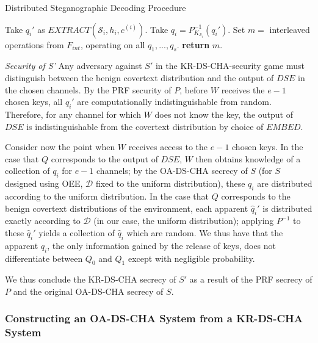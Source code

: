 \documentclass{article}
\begin{document}
\begin{algorithm}[H]
\caption{Distributed Steganographic Decoding Procedure}\label{1a}
\begin{algorithmic}[1]
\State Take $q_i'$ as $EXTRACT(\mathcal{S}_i, h_i, c^{(i)})$.
\State Take $q_i = P_{K_{\mathcal{S}_i}}^{-1}(q_i')$.
\EndFor
\State Set $m = $ interleaved operations from $F_{int}$, operating on all $q_1,...,q_s$. 
\State \textbf{return} $m$.
\EndProcedure
\end{algorithmic}
\end{algorithm}

\noindent \textit{Security of S' } 
Any adversary against $S'$ in the KR-DS-CHA-security game must distinguish between the benign 
covertext distribution and the output of $DSE$ in the chosen channels.  By the PRF security of 
$P$, before $W$ receives the $e-1$ chosen keys, all $q_i'$ are computationally indistinguishable 
from random.  Therefore, for any channel for which $W$ does not know the key, the output of $DSE$ 
is indistinguishable from the covertext distribution by choice of $EMBED$.

Consider now the point when $W$ receives access to the $e-1$ chosen keys.  In the case that $Q$ corresponds to the 
output of $DSE$, $W$ then obtains knowledge 
of a collection of $q_i$ for $e-1$ channels; by the OA-DS-CHA secrecy of $S$ (for $S$ designed using OEE, $\mathcal{D}$ fixed 
to the uniform distribution), these $q_i$ are distributed according to the uniform distribution.  In the case that $Q$ corresponds 
to the benign covertext distributions of the environment, each apparent $\hat{q}_i'$ is distributed exactly according to $\mathcal{D}$ 
(in our case, the uniform distribution); 
applying $P^{-1}$ to these $\hat{q}_i'$ yields a collection of $\hat{q}_i$ which are random.  We thus have that the apparent $q_i$, the only 
information gained by the release of keys, does not differentiate between $Q_0$ and $Q_1$ except with negligible probability.

We thus conclude the KR-DS-CHA secrecy of $S'$ as a result of the PRF secrecy of $P$ and the original OA-DS-CHA secrecy of $S$.

\subsubsection{Constructing an OA-DS-CHA System from a KR-DS-CHA System}
\end{document}

